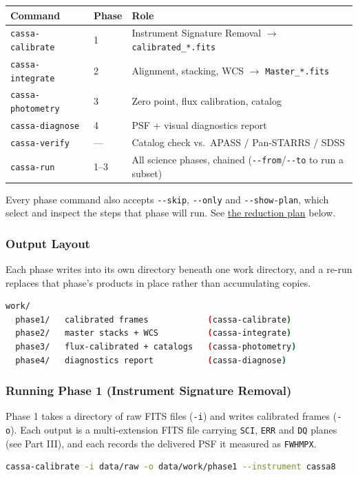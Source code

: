 \documentclass[11pt,a4paper]{article}
\begin{document}
\begin{center}
\begin{tabularx}{\textwidth}{|l|l|X|}
\hline
\textbf{Command} & \textbf{Phase} & \textbf{Role} \\
\hline
\texttt{cassa-calibrate} & 1 & Instrument Signature Removal $\rightarrow$ \texttt{calibrated\_*.fits} \\
\hline
\texttt{cassa-integrate} & 2 & Alignment, stacking, WCS $\rightarrow$ \texttt{Master\_*.fits} \\
\hline
\texttt{cassa-photometry} & 3 & Zero point, flux calibration, catalog \\
\hline
\texttt{cassa-diagnose} & 4 & PSF + visual diagnostics report \\
\hline
\texttt{cassa-verify} & --- & Catalog check vs.\ APASS / Pan-STARRS / SDSS \\
\hline
\texttt{cassa-run} & 1--3 & All science phases, chained (\texttt{-{}-from}/\texttt{-{}-to} to run a subset) \\
\hline
\end{tabularx}
\end{center}

Every phase command also accepts \texttt{-{}-skip}, \texttt{-{}-only} and
\texttt{-{}-show-plan}, which select and inspect the steps that phase will run.
See \hyperref[sec:stepplan]{the reduction plan} below.

\subsubsection{Output Layout}
Each phase writes into its own directory beneath one work directory, and a
re-run replaces that phase's products in place rather than accumulating copies.
\begin{lstlisting}[language=bash]
work/
  phase1/   calibrated frames            (cassa-calibrate)
  phase2/   master stacks + WCS          (cassa-integrate)
  phase3/   flux-calibrated + catalogs   (cassa-photometry)
  phase4/   diagnostics report           (cassa-diagnose)
\end{lstlisting}

\subsubsection{Running Phase 1 (Instrument Signature Removal)}
Phase 1 takes a directory of raw FITS files (\texttt{-i}) and writes calibrated
frames (\texttt{-o}). Each output is a multi-extension FITS file carrying
\texttt{SCI}, \texttt{ERR} and \texttt{DQ} planes (see Part III), and each
records the delivered PSF it measured as \texttt{FWHMPX}.
\begin{lstlisting}[language=bash]
cassa-calibrate -i data/raw -o data/work/phase1 --instrument cassa8
\end{lstlisting}
\end{document}
